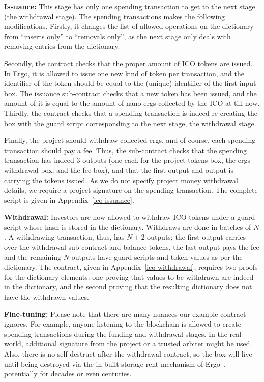\documentclass[runningheads]{llncs}
\begin{document}
\textbf{Issuance:}
This stage has only one spending transaction to get to the next stage (the withdrawal stage). The spending transactions makes the following modifications. Firstly, it changes the list of allowed operations on the dictionary from ``inserts only'' to ``removals only'', as the next stage only deals with removing entries from the dictionary.

Secondly, the contract checks that the proper amount of ICO tokens are issued. In Ergo, it is allowed to issue one new kind of token per transaction, and the identifier of the token should be equal to the (unique) identifier of the first input box. The issuance sub-contract checks that a new token has been issued, and the amount of it is equal to the amount of nano-ergs collected by the ICO at till now. Thirdly, the contract checks that a spending transaction is indeed re-creating the box with the guard script corresponding to the next stage, the withdrawal stage.

Finally, the project should withdraw collected ergs, and of course, each spending transaction should pay a fee. Thus, the sub-contract checks that the spending transaction has indeed 3 outputs (one each for the project tokens box, the ergs withdrawal box, and the fee box), and that the first output and output is carrying the tokens issued. As we do not specify project money withdrawal details, we require a project signature on the spending transaction. The complete script is given in Appendix~\ref{ico-issuance}.

\textbf{Withdrawal:}
Investors are now allowed to withdraw ICO tokens under a guard script whose hash is stored in the dictionary. Withdraws are done in batches of $N$. A withdrawing transaction, thus, has $N + 2$ outputs; the first output carries over the withdrawal sub-contract and balance tokens, the last output pays the fee and the remaining $N$ outputs have guard scripts and token values as per the dictionary. The contract, given in Appendix~\ref{ico-withdrawal}, requires two proofs for the dictionary elements: one proving that values to be withdrawn are indeed in the dictionary, and the second proving that the resulting dictionary does not have the withdrawn values. 


\textbf{Fine-tuning:} Please note that there are many nuances our example contract ignores. For example, anyone listening to the blockchain is allowed to create spending transactions during the funding and withdrawal stages. In the real-world, additional signature from the project or a trusted arbiter might be used. Also, there is no self-destruct after the withdrawal contract, so the box will live until being destroyed via the in-built storage rent mechanism of Ergo~\cite{tutorial}, potentially for decades or even centuries. 
\end{document}
